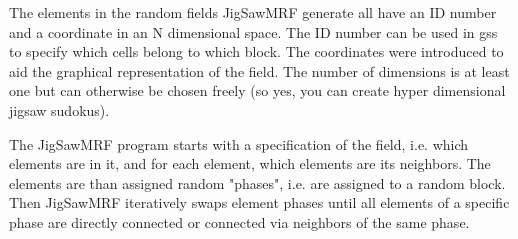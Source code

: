 \documentclass[12pt]{article}
\begin{document}
The elements in the random fields JigSawMRF generate all have an ID number and a coordinate in an N dimensional space. The ID number can be used in gss to specify which cells belong to which block. The coordinates were introduced to aid the graphical representation of the field. The number of dimensions is at least one but can otherwise be chosen freely (so yes, you can create hyper dimensional jigsaw sudokus). 

The JigSawMRF program starts with a specification of the field, i.e. which elements are in it, and for each element, which elements are its neighbors. The elements are than assigned random "phases", i.e. are assigned to a random block. Then JigSawMRF iteratively swaps element phases until all elements of a specific phase are directly connected or connected via neighbors of the same phase.
\end{document}
